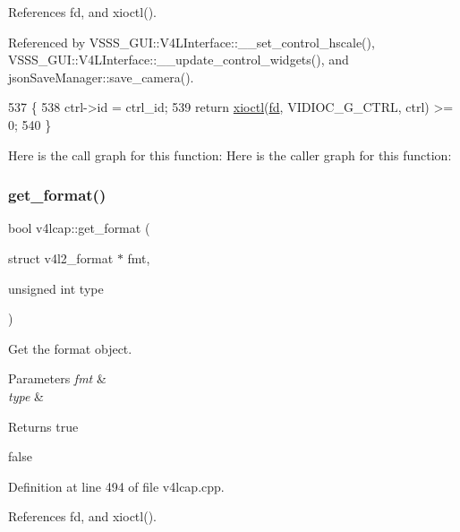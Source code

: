 References fd, and xioctl().



Referenced by V\+S\+S\+S\+\_\+\+G\+U\+I\+::\+V4\+L\+Interface\+::\+\_\+\+\_\+set\+\_\+control\+\_\+hscale(), V\+S\+S\+S\+\_\+\+G\+U\+I\+::\+V4\+L\+Interface\+::\+\_\+\+\_\+update\+\_\+control\+\_\+widgets(), and json\+Save\+Manager\+::save\+\_\+camera().


\begin{DoxyCode}
537                                                                          \{
538     ctrl->id = ctrl\_id;
539     \textcolor{keywordflow}{return} \hyperlink{classv4lcap_ab5aaa5a8c0df17f5ca57e0b5170232cb}{xioctl}(\hyperlink{classv4lcap_a38109593bde997dad13b3a461569573d}{fd}, VIDIOC\_G\_CTRL, ctrl) >= 0;
540 \}
\end{DoxyCode}
Here is the call graph for this function\+:
Here is the caller graph for this function\+:
\mbox{\label{classv4lcap_aa5c521438e06e14625c05a02bafd35c1}} 
\subsubsection{\texorpdfstring{get\+\_\+format()}{get\_format()}\hspace{0.1cm}{\footnotesize\ttfamily [1/2]}}
{\footnotesize\ttfamily bool v4lcap\+::get\+\_\+format (\begin{DoxyParamCaption}\item[{struct v4l2\+\_\+format $\ast$}]{fmt,  }\item[{unsigned int}]{type }\end{DoxyParamCaption})}



Get the format object. 


\begin{DoxyParams}{Parameters}
{\em fmt} & \\
\hline
{\em type} & \\
\hline
\end{DoxyParams}
\begin{DoxyReturn}{Returns}
true 

false 
\end{DoxyReturn}


Definition at line 494 of file v4lcap.\+cpp.



References fd, and xioctl().



